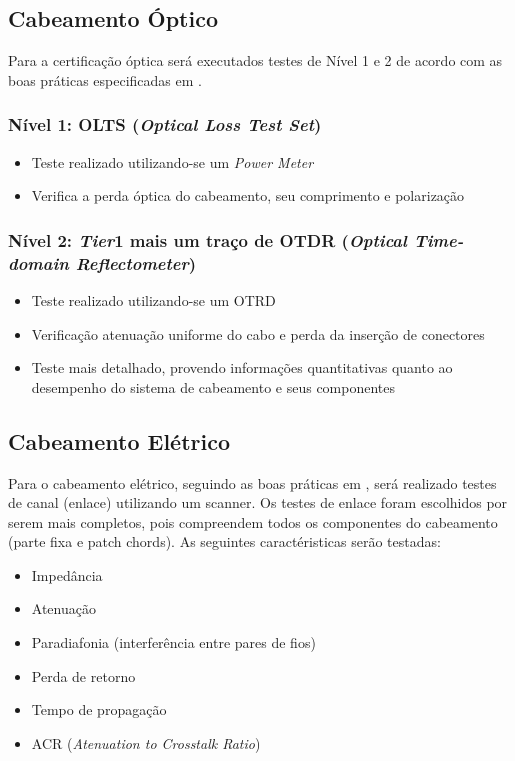\documentclass[	DIV=calc,%
							paper=a4,%
							fontsize=12pt,%
							onecolumn]{scrartcl}	 					%
\begin{document}
\subsection{Cabeamento Óptico}
Para a certificação óptica será executados testes de Nível 1 e 2 de acordo com as boas práticas especificadas em \cite{ref6}.
\subsubsection{Nível 1: OLTS (\textit{Optical Loss Test Set})}
\begin{itemize}
	\item Teste realizado utilizando-se um \textit{Power Meter}
	\item Verifica a perda óptica do cabeamento, seu comprimento e polarização
\end{itemize}

\subsubsection{Nível 2: \textit{Tier}1 mais um traço de OTDR (\textit{Optical Time-domain Reflectometer})}
\begin{itemize}
	\item Teste realizado utilizando-se um OTRD
	\item Verificação atenuação uniforme do cabo e perda da inserção de conectores
	\item Teste mais detalhado, provendo informações quantitativas quanto ao desempenho do sistema de cabeamento e seus componentes
\end{itemize}

\subsection{Cabeamento Elétrico}
Para o cabeamento elétrico, seguindo as boas práticas em \cite{ref6}, será realizado testes de canal (enlace) utilizando um scanner.
Os testes de enlace foram escolhidos por serem mais completos, pois compreendem todos os componentes do cabeamento (parte fixa e patch chords).
As seguintes caractéristicas serão testadas:
\begin{itemize}
	\item Impedância
	\item Atenuação
	\item Paradiafonia (interferência entre pares de fios)
	\item Perda de retorno
	\item Tempo de propagação
	\item ACR (\textit{Atenuation to Crosstalk Ratio})
\end{itemize}
\end{document}
